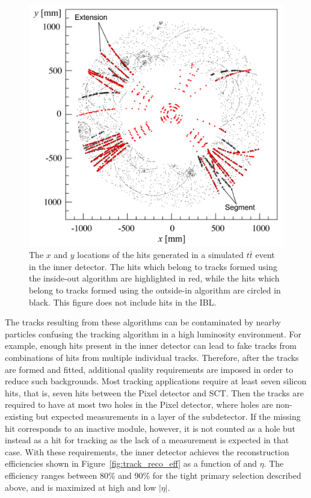 \begin{figure}
\includegraphics[width=\fullfig]{figures/track_patterns.png}
\caption{The $x$ and $y$ locations of the hits generated in a simulated $t\bar{t}$ event in the inner detector. The hits which belong to tracks formed using the inside-out algorithm are highlighted in red, while the hits which belong to tracks formed using the outside-in algorithm are circled in black. This figure does not include hits in the \acs*{IBL}.}
\label{fig:track_patterns}
\end{figure}

The tracks resulting from these algorithms can be contaminated by nearby particles confusing the tracking algorithm in a high luminosity environment.
For example, enough hits present in the inner detector can lead to fake tracks from combinations of hits from multiple individual tracks.
Therefore, after the tracks are formed and fitted, additional quality requirements are imposed in order to reduce such backgrounds.
Most tracking applications require at least seven silicon hits, that is, seven hits between the Pixel detector and \ac{SCT}.
Then the tracks are required to have at most two holes in the Pixel detector, where holes are non-existing but expected measurements in a layer of the subdetector.
If the missing hit corresponds to an inactive module, however, it is not counted as a hole but instead as a hit for tracking as the lack of a measurement is expected in that case.
With these requirements, the inner detector achieves the reconstruction efficiencies shown in Figure~\ref{fig:track_reco_eff} as a function of \pt and $\eta$.
The efficiency ranges between 80\% and 90\% for the tight primary selection described above, and is maximized at high \pt and low $|\eta|$.

